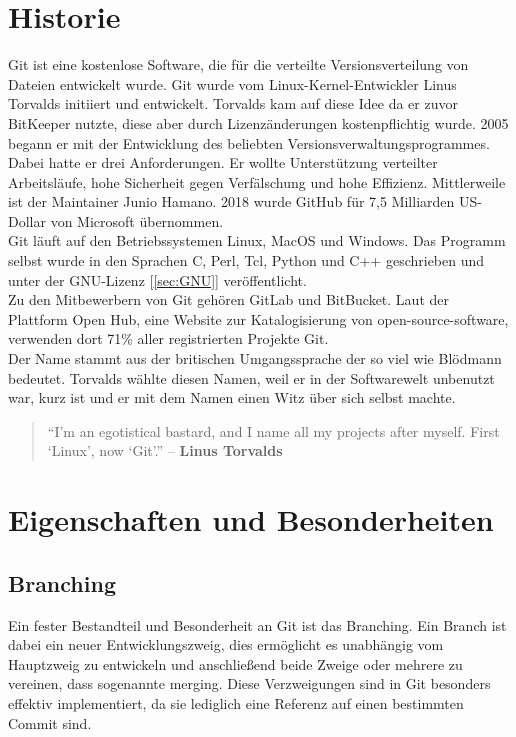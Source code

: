 \section*{Historie}
Git ist eine kostenlose Software, die für die verteilte Versionsverteilung von Dateien entwickelt wurde. Git wurde vom Linux-Kernel-Entwickler Linus Torvalds initiiert und entwickelt. Torvalds kam auf diese Idee da er zuvor BitKeeper nutzte, diese aber durch Lizenzänderungen kostenpflichtig wurde. 2005 begann er mit der Entwicklung des beliebten Versionsverwaltungsprogrammes. Dabei hatte er drei Anforderungen. Er wollte Unterstützung verteilter Arbeitsläufe, hohe Sicherheit gegen Verfälschung und hohe Effizienz. Mittlerweile ist der Maintainer Junio Hamano. 2018 wurde GitHub für 7,5 Milliarden US-Dollar von Microsoft übernommen. \\
Git läuft auf den Betriebssystemen Linux, MacOS und Windows. Das Programm selbst wurde in den Sprachen C, Perl, Tcl, Python und C++ geschrieben und unter der GNU-Lizenz [\ref{sec:GNU}] veröffentlicht. 
\\
Zu den Mitbewerbern von Git gehören GitLab und BitBucket. Laut der Plattform Open Hub, eine Website zur Katalogisierung von open-source-software, verwenden dort 71\% aller registrierten Projekte Git. \cite{GitMarketshare}
\\
Der Name stammt aus der britischen Umgangssprache der so viel wie Blödmann bedeutet. Torvalds wählte diesen Namen, weil er in der Softwarewelt unbenutzt war, kurz ist und er mit dem Namen einen Witz über sich selbst machte.
\\
\begin{quote}
	“I’m an egotistical bastard, and I name all my projects after myself. First ‘Linux’, now ‘Git’.” – \textbf{Linus Torvalds} \cite{TorvaldsJoke} 
\end{quote}
\clearpage
\newpage
\section*{Eigenschaften und Besonderheiten}
\subsection*{Branching}
Ein fester Bestandteil und Besonderheit an Git ist das Branching. Ein Branch ist dabei ein neuer Entwicklungszweig, dies ermöglicht es unabhängig vom Hauptzweig zu entwickeln und anschließend beide Zweige oder mehrere zu vereinen, dass sogenannte merging. Diese Verzweigungen sind in Git besonders effektiv implementiert, da sie lediglich eine Referenz auf einen bestimmten Commit sind.



